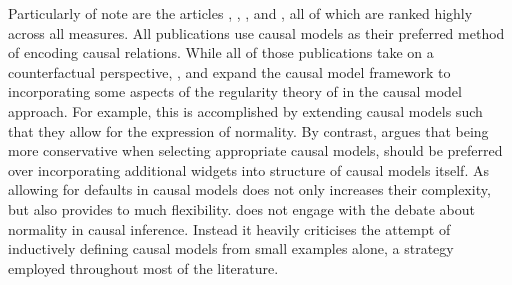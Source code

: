 \documentclass[11pt,a4paper]{book}
\theoremstyle{definition}
\theoremstyle{definition}
\theoremstyle{definition}
\theoremstyle{remark}
\begin{document}
Particularly of note are the articles \cite{weslake2015partial}, \cite{blanchard2017cause}, \cite{halpern2011actual}, \cite{glymour2010actual} and \cite{halpern2015graded}, all of which are ranked highly across all measures. 
All publications use causal models as their preferred method of encoding causal relations.  
While all of those publications take on a counterfactual perspective, \parencite{halpern2011actual}, \parencite{weslake2015partial} and \parencite{halpern2015graded} expand the causal model framework to incorporating some aspects of the regularity theory of in the causal model approach. For example, this is accomplished by extending causal models such that they allow for the expression of normality.
By contrast, \parencite{blanchard2017cause} argues that being more conservative when selecting appropriate causal models, should be preferred over incorporating additional widgets into structure of causal models itself.
As allowing for defaults in causal models does not only increases their complexity, but also provides to much flexibility. 
\parencite{glymour2010actual} does not engage with the debate about normality in causal inference. Instead it heavily criticises the attempt of inductively defining causal models from small examples alone, a strategy employed  throughout most of the literature.
\end{document}
